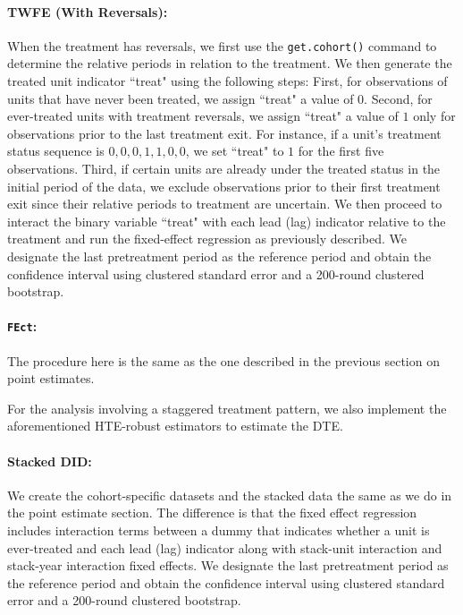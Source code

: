 \documentclass[12pt]{article}
\begin{document}
\paragraph*{TWFE (With Reversals):} When the treatment has reversals, we first use the \texttt{get.cohort()} command to determine the relative periods in relation to the treatment. We then generate the treated unit indicator ``treat" using the following steps: First, for observations of units that have never been treated, we assign ``treat" a value of $0$. Second, for ever-treated units with treatment reversals, we assign ``treat" a value of $1$ only for observations prior to the last treatment exit. For instance, if a unit's treatment status sequence is $0, 0, 0, 1, 1, 0, 0$, we set ``treat" to $1$ for the first five observations. Third, if certain units are already under the treated status in the initial period of the data, we exclude observations prior to their first treatment exit since their relative periods to treatment are uncertain. We then proceed to interact the binary variable ``treat" with each lead (lag) indicator relative to the treatment and run the fixed-effect regression as previously described. We designate the last pretreatment period as the reference period and obtain the confidence interval using clustered standard error and a 200-round clustered bootstrap.

\paragraph*{\texttt{FEct}:} The procedure here is the same as the one described in the previous section on point estimates.



\bigskip For the analysis involving a staggered treatment pattern, we also implement the aforementioned HTE-robust estimators to estimate the DTE.

\paragraph*{Stacked DID:} We create the cohort-specific datasets and the stacked data the same as we do in the point estimate section. The difference is that the fixed effect regression includes interaction terms between a dummy that indicates whether a unit is ever-treated and each lead (lag) indicator along with stack-unit interaction and stack-year interaction fixed effects. We designate the last pretreatment period as the reference period and obtain the confidence interval using clustered standard error and a 200-round clustered bootstrap.
\end{document}

